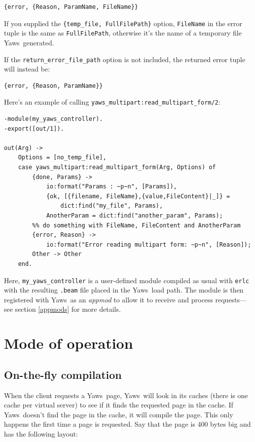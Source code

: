 \documentclass[11pt,oneside,english]{book}
\newcommand{\Yaws}            %
        {{\sc Yaws}}
\begin{document}
\begin{verbatim}
{error, {Reason, ParamName, FileName}}
\end{verbatim}

If you supplied the \verb+{temp_file, FullFilePath}+ option,
\verb+FileName+ in the error tuple is the same as \verb+FullFilePath+,
otherwise it's the name of a temporary file \Yaws\ generated.

If the \verb+return_error_file_path+ option is not included, the
returned error tuple will instead be:

\begin{verbatim}
{error, {Reason, ParamName}}
\end{verbatim}

Here's an example of calling \verb+yaws_multipart:read_multipart_form/2+:

\begin{verbatim}
-module(my_yaws_controller).
-export([out/1]).

out(Arg) ->
    Options = [no_temp_file],
    case yaws_multipart:read_multipart_form(Arg, Options) of
        {done, Params} ->
            io:format("Params : ~p~n", [Params]),
            {ok, [{filename, FileName},{value,FileContent}|_]} =
                dict:find("my_file", Params),
            AnotherParam = dict:find("another_param", Params);
        %% do something with FileName, FileContent and AnotherParam
        {error, Reason} ->
            io:format("Error reading multipart form: ~p~n", [Reason]);
        Other -> Other
    end.
\end{verbatim}

Here, \verb+my_yaws_controller+ is a user-defined module compiled as
usual with \verb+erlc+ with the resulting \verb+.beam+ file placed in
the \Yaws\ load path. The module is then registered with \Yaws\ as an
\emph{appmod} to allow it to receive and process requests---see
section \ref{appmods} for more details.

\chapter{Mode of operation}

\section{On-the-fly compilation}
When the client requests a \Yaws\ page, \Yaws\ will look in its caches
(there is one cache per virtual server) to see if it finds the
requested page in the cache. If \Yaws\ doesn't find the page in the
cache, it will compile the page. This only happens the first time a
page is requested.  Say that the page is 400 bytes big and has the
following layout:
\end{document}
